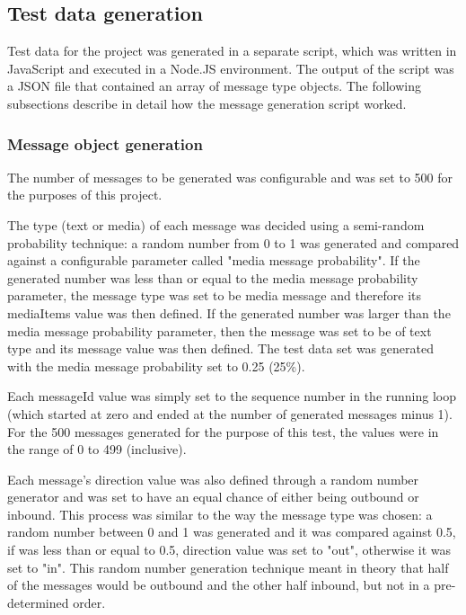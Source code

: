 \documentclass[a4paper,12pt]{article}
\begin{document}
\subsection{Test data generation}
Test data for the project was generated in a separate script, which was written in JavaScript and executed in a Node.JS environment. The output of the script was a JSON file that contained an array of message type objects. The following subsections describe in detail how the message generation script worked.

\subsubsection{Message object generation}
The number of messages to be generated was configurable and was set to 500 for the purposes of this project.

The type (text or media) of each message was decided using a semi-random probability technique: a random number from 0 to 1 was generated and compared against a configurable parameter called "media message probability". If the generated number was less than or equal to the media message probability parameter, the message type was set to be media message and therefore its mediaItems value was then defined. If the generated number was larger than the media message probability parameter, then the message was set to be of text type and its message value was then defined. The test data set was generated with the media message probability set to 0.25 (25\%).

Each messageId value was simply set to the sequence number in the running loop (which started at zero and ended at the number of generated messages minus 1). For the 500 messages generated for the purpose of this test, the values were in the range of 0 to 499 (inclusive).

Each message's direction value was also defined through a random number generator and was set to have an equal chance of either being outbound or inbound. This process was similar to the way the message type was chosen: a random number between 0 and 1 was generated and it was compared against 0.5, if was less than or equal to 0.5, direction value was set to "out", otherwise it was set to "in". This random number generation technique meant in theory that half of the messages would be outbound and the other half inbound, but not in a pre-determined order.
\end{document}
